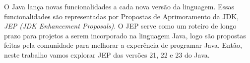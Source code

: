 \documentclass{lib/eng_softdoc}
\begin{document}
    \makeheader
    
    \vspace*{1cm}

    O Java lança novas funcionalidades a cada nova versão da linguagem. Essas funcionalidades são representadas por Propostas de Aprimoramento da JDK, \textit{JEP (JDK Enhancement Proposals)}. O JEP serve como um roteiro de longo prazo para projetos a serem incorporado na linguagem Java, logo são propostas feitas pela comunidade para melhorar a experência de programar Java. Então, neste trabalho vamos explorar JEP das versões 21, 22 e 23 do Java.  
\end{document}
